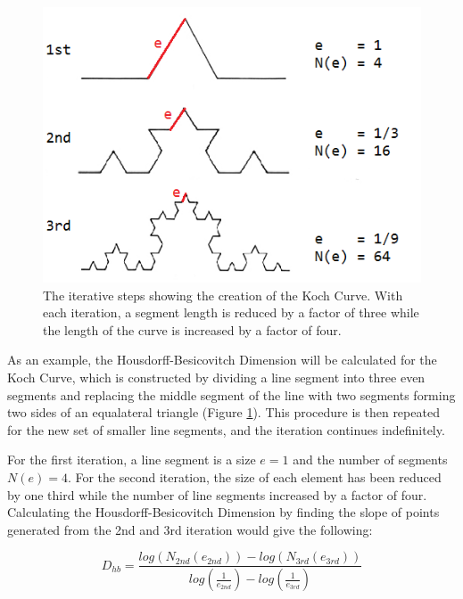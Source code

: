 \documentclass[12pt, oneside]{book}
\begin{document}
\begin{figure}[!b]
  \centering
  \includegraphics[width=\textwidth]{figures/kochDexample.png}
  \caption[The iterative steps showing the creation of the Koch Curve.]{The iterative steps showing the creation of the Koch Curve. With each iteration, a segment length is reduced by a factor of three while the length of the curve is increased by a factor of four.}
  \label{fig:kochDexamp}
\end{figure}

As an example, the Housdorff-Besicovitch Dimension will be calculated for the Koch Curve, which is constructed by dividing a line segment into three even segments and replacing the middle segment of the line with two segments forming two sides of an equalateral triangle (Figure \ref{fig:kochDexamp}).  This procedure is then repeated for the new set of smaller line segments, and the iteration continues indefinitely.

For the first iteration, a line segment is a size \(e = 1\) and the number of segments \(N(e) = 4\).  For the second iteration, the size of each element has been reduced by one third while the number of line segments increased by a factor of four.  Calculating the Housdorff-Besicovitch Dimension by finding the slope of points generated from the 2nd and 3rd iteration would give the following:

\begin{equation} \tag{3}
D_{hb} = \frac{log( N_{2nd}(e_{2nd})) - log( N_{3rd}(e_{3rd})) }{log( \frac{1}{e_{2nd}}) - log(\frac{1}{e_{3rd}})}
\end{equation}
\end{document}

